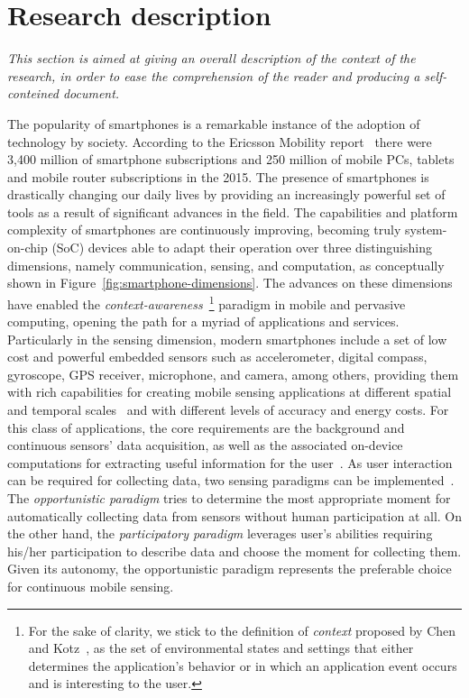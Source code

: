 \documentclass[ENG,PhD]{cinvestav}
\begin{document}
\section{Research description}
\label{sub:research-context}
\emph{This section is aimed at giving an overall description of the context of the research, in order to ease the comprehension of the reader and producing a self-conteined document.}


The popularity of smartphones is a remarkable instance of the adoption of technology by society.
According to the Ericsson Mobility report~\cite{Ericsson2015} there were 3,400 million of smartphone subscriptions and 250 million of mobile PCs, tablets and mobile router subscriptions in the 2015.
The presence of smartphones is drastically changing our daily lives by providing an increasingly powerful set of tools as a result of significant advances in the field.
The capabilities and platform complexity of smartphones are continuously improving, becoming truly system-on-chip (SoC) devices able to adapt their operation over three distinguishing dimensions, namely communication, sensing, and computation, as conceptually shown in Figure~\ref{fig:smartphone-dimensions}.
The advances on these dimensions have enabled the \emph{context-awareness}~\footnote{For the sake of clarity, we stick to the definition of \emph{context} proposed by Chen and Kotz~\cite{Chen2000}, as the set of environmental states and settings that either determines the application’s behavior or in which an application event occurs and is interesting to the user.} paradigm in mobile and pervasive computing, opening the path for a myriad of applications and services.
Particularly in the sensing dimension, modern smartphones include a set of low cost and powerful embedded sensors such as accelerometer, digital compass, gyroscope, GPS receiver, microphone, and camera, among others, providing them with rich capabilities for creating mobile sensing applications at different spatial and temporal scales~\cite{Lane2010,Campbell2012,Kjaergaard2012} and with different levels of accuracy and energy costs.
For this class of applications, the core requirements are the background and continuous sensors' data acquisition, as well as the associated on-device computations for extracting useful information for the user~\cite{Lane2010,Ra2012}.
As user interaction can be required for collecting data, two sensing paradigms can be implemented~\cite{Lane2010}.
The \emph{opportunistic paradigm} tries to determine the most appropriate moment for automatically collecting data from sensors without human participation at all.
On the other hand, the \emph{participatory paradigm} leverages user's abilities requiring his/her participation to describe data and choose the moment for collecting them.
Given its autonomy, the opportunistic paradigm represents the preferable choice for continuous mobile sensing.
\end{document}
